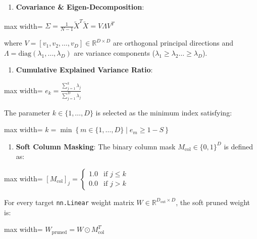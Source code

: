 \begin{enumerate}
\item \textbf{Covariance \& Eigen-Decomposition}:
\end{enumerate}
\begin{center}
\begin{adjustbox}{max width=\columnwidth}
$\displaystyle
\Sigma = \frac{1}{N-1} \widetilde{X}^T \widetilde{X} = V \Lambda V^T
$
\end{adjustbox}
\end{center}
where $V = [v_1, v_2, \dots, v_D] \in \mathbb{R}^{D \times D}$ are orthogonal principal directions and $\Lambda = \text{diag}(\lambda_1, \dots, \lambda_D)$ are variance components ($\lambda_1 \ge \lambda_2 \dots \ge \lambda_D$).

\begin{enumerate}
\item \textbf{Cumulative Explained Variance Ratio}:
\end{enumerate}
\begin{center}
\begin{adjustbox}{max width=\columnwidth}
$\displaystyle
e_k = \frac{\sum_{j=1}^k \lambda_j}{\sum_{j=1}^D \lambda_j}
$
\end{adjustbox}
\end{center}
The parameter $k \in \{1, \dots, D\}$ is selected as the minimum index satisfying:
\begin{center}
\begin{adjustbox}{max width=\columnwidth}
$\displaystyle
k = \min \left\{ m \in \{1, \dots, D\} \;\Big|\; e_m \ge 1 - S \right\}
$
\end{adjustbox}
\end{center}

\begin{enumerate}
\item \textbf{Soft Column Masking}:
The binary column mask $M_{\text{col}} \in \{0, 1\}^D$ is defined as:
\end{enumerate}
\begin{center}
\begin{adjustbox}{max width=\columnwidth}
$\displaystyle
[M_{\text{col}}]_j = \begin{cases} 1.0 & \text{if } j \le k \\ 0.0 & \text{if } j > k \end{cases}
$
\end{adjustbox}
\end{center}
For every target \texttt{nn.Linear} weight matrix $W \in \mathbb{R}^{D_{\text{out}} \times D}$, the soft pruned weight is:
\begin{center}
\begin{adjustbox}{max width=\columnwidth}
$\displaystyle
W_{\text{pruned}} = W \odot M_{\text{col}}^T
$
\end{adjustbox}
\end{center}


